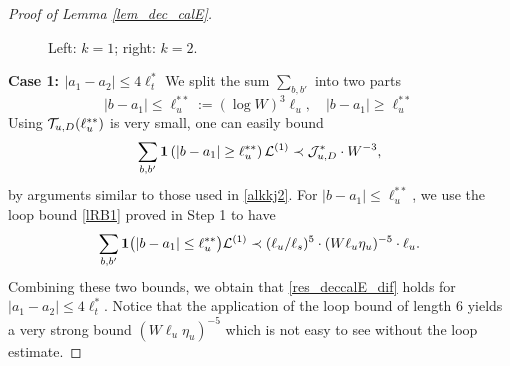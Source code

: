 \documentclass[10pt,reqno]{article}
\theoremstyle{plain} %
\theoremstyle{remark}
\numberwithin{equation}{section}
\begin{document}
\begin{proof}[Proof of Lemma \ref{lem_dec_calE}]
\begin{figure}[ht]
\caption{\hspace{.1in} Left: $k=1$; \hspace{1.4in} right: $k=2$.}
\label{fig:graph-6Gfor2G}
\end{figure}

\noindent 
{\bf Case 1: $|a_1-a_2|\le 4\ell_t^*$ } 
We split the sum $\sum_{b,b'}$ into two parts 
$$
|b-a_1|\le \ell_u^{** }:=(\log W)^3 \ell_u,\quad |b-a_1|\ge \ell_u^{** } 
$$
Using ${\cal T}_{u,D}(\ell_u^{** }) $ is very small,  one can easily bound 
$$
\sum_{b,b'} {\bf 1}\left(|b-a_1|\ge \ell_u^{** }\right){\cal L}^{(1)}\prec {\cal J}^*_{u,D}\cdot W^{-3},
$$
by arguments similar to those used in \eqref{alkkj2}.
For $|b-a_1|\le  \ell_u^{** } $, we use 
the loop bound \eqref{lRB1} proved in Step 1 to have 
\begin{align}\label{alkkj3}
\sum_{b,b'}{\bf 1}\big(|b-a_1|\le  \ell_u^{** }\big) {\cal L}^{(1)}  \prec (\ell_u/\ell_s)^5\cdot (W\ell_u\eta_u)^{-5} \cdot \ell_u   .
\end{align}
Combining  these two bounds, we obtain that \eqref{res_deccalE_dif} holds for $|a_1-a_2|\le 4\ell_t^*$. Notice that the application of the loop bound of length $6$ yields a very strong bound $(W\ell_u\eta_u)^{-5}$ which is not easy to see without the loop estimate. 

 \medskip



\end{proof}
\end{document}
